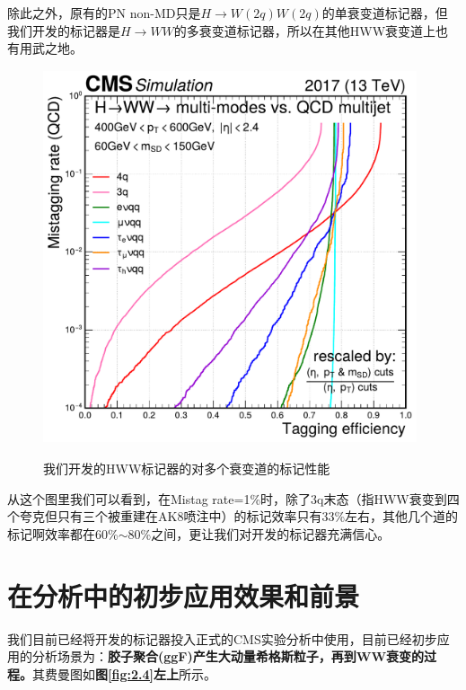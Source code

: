 除此之外，原有的PN non-MD只是$H\to W(2q)W(2q)$的单衰变道标记器，但我们开发的标记器是$H\to WW$的多衰变道标记器，所以在其他HWW衰变道上也有用武之地。
\begin{figure}[H]
 \centering
 \caption{我们开发的HWW标记器的对多个衰变道的标记性能}
 \includegraphics[height=11cm, width=11cm]{pictures/ROC_multi-modes_PKU_std.pdf}
 \label{fig:5.5}
\end{figure}
从这个图里我们可以看到，在Mistag rate=1\%时，除了3q末态（指HWW衰变到四个夸克但只有三个被重建在AK8喷注中）的标记效率只有33\%左右，其他几个道的标记啊效率都在60\%$\sim$80\%之间，更让我们对开发的标记器充满信心。
\section{在分析中的初步应用效果和前景}
我们目前已经将开发的标记器投入正式的CMS实验分析中使用，目前已经初步应用的分析场景为：\textbf{胶子聚合(ggF)产生大动量希格斯粒子，再到WW衰变的过程。}其费曼图如\textbf{图\ref{fig:2.4}左上}所示。

